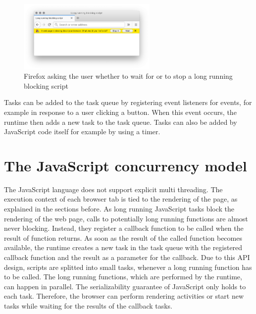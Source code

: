 \documentclass[
	ruledheaders=section,%
	class=report,%
	thesis={type=bachelor},%
	accentcolor=9c,%
	custommargins=true,%
	marginpar=false,%
	parskip=half-,%
	fontsize=11pt,%
]{tudapub}
\begin{document}
  \begin{figure}
    \centering
    \includegraphics[width=0.6\textwidth]{images/blocking-script.png}
    \caption{Firefox asking the user whether to wait for or to stop a long running blocking script}
    \label{fig:blocking-script}
  \end{figure}

  Tasks can be added to the task queue by registering event listeners for events, for example in response to a user clicking a button. When this event occurs, the runtime then adds a new task to the task queue. Tasks can also be added by JavaScript code itself for example by using a timer.
  
  \section{The JavaScript concurrency model}
  
  The JavaScript language does not support explicit multi threading. The execution context of each browser tab is tied to the rendering of the page, as explained in the sections before. As long running JavaScript tasks block the rendering of the web page, calls to potentially long running functions are almost never blocking. Instead, they register a callback function to be called when the result of function returns. As soon as the result of the called function becomes available, the runtime creates a new task in the task queue with the registered callback function and the result as a parameter for the callback. Due to this API design, scripts are splitted into small tasks, whenever a long running function has to be called. The long running functions, which are performed by the runtime, can happen in parallel. The serializability guarantee of JavaScript only holds to each task. Therefore, the browser can perform rendering activities or start new tasks while waiting for the results of the callback tasks.
\end{document}
